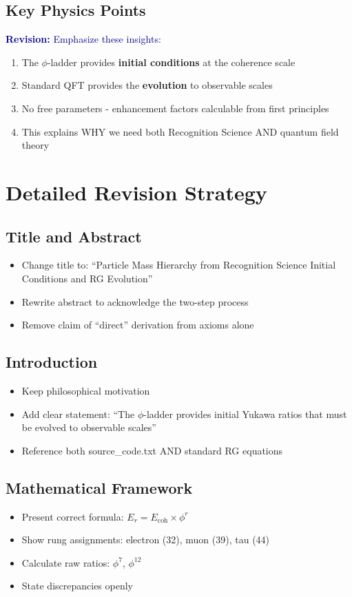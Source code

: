 \documentclass[12pt,a4paper]{article}
\newcommand{\revision}[1]{\textcolor{darkblue}{\textbf{Revision: }#1}}
\begin{document}
\subsection{Key Physics Points}

\revision{Emphasize these insights:}

\begin{enumerate}
\item The $\phi$-ladder provides \textbf{initial conditions} at the coherence scale
\item Standard QFT provides the \textbf{evolution} to observable scales  
\item No free parameters - enhancement factors calculable from first principles
\item This explains WHY we need both Recognition Science AND quantum field theory
\end{enumerate}

\section{Detailed Revision Strategy}

\subsection{Title and Abstract}
\begin{itemize}
\item Change title to: ``Particle Mass Hierarchy from Recognition Science Initial Conditions and RG Evolution''
\item Rewrite abstract to acknowledge the two-step process
\item Remove claim of ``direct'' derivation from axioms alone
\end{itemize}

\subsection{Introduction}
\begin{itemize}
\item Keep philosophical motivation
\item Add clear statement: ``The $\phi$-ladder provides initial Yukawa ratios that must be evolved to observable scales''
\item Reference both source\_code.txt AND standard RG equations
\end{itemize}

\subsection{Mathematical Framework}
\begin{itemize}
\item Present correct formula: $E_r = E_{\text{coh}} \times \phi^r$
\item Show rung assignments: electron (32), muon (39), tau (44)
\item Calculate raw ratios: $\phi^7$, $\phi^{12}$
\item State discrepancies openly
\end{itemize}
\end{document}
